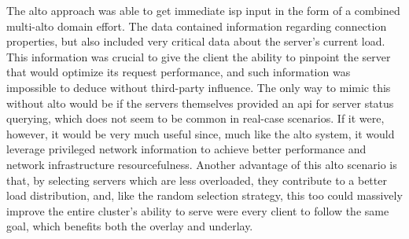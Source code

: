    The \gls{alto} approach was able to get immediate \gls{isp} input in the form of a combined multi-\gls{alto} domain effort.
    The data contained information regarding connection properties, but also included very critical data about the server's current load.
    This information was crucial to give the client the ability to pinpoint the server that would optimize its request performance, and such information was impossible to deduce without third-party influence.
    The only way to mimic this without \gls{alto} would be if the servers themselves provided an \gls{api} for server status querying, which does not seem to be common in real-case scenarios.
    If it were, however, it would be very much useful since, much like the \gls{alto} system, it would leverage privileged network information to achieve better performance and network infrastructure resourcefulness.
    Another advantage of this \gls{alto} scenario is that, by selecting servers which are less overloaded, they contribute to a better load distribution, and, like the random selection strategy, this too could massively improve the entire cluster's ability to serve were every client to follow the same goal, which benefits both the overlay and underlay.


